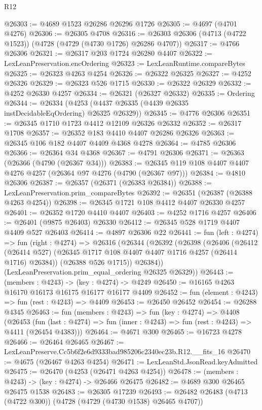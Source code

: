\begin{lexlean}{R12}
\begin{coremodule}
@26303 := @4689 @1523 @26286 @26296 @1726
@26305 := @4697 (@4701 @4276)
@26306 := @26305 @4708
@26316 := @26303 @26306 (@4713 (@4722 @1523)) (@4728 (@4729 (@4730 @1726) @26286 @4707))
@26317 := @4766 @26306
@26321 := @26317 @203 @1724 @26280 @4407
@26322 := LexLeanPreservation.encOrdering
@26323 := LexLeanRuntime.compareBytes
@26325 := @26323 @4263 @4254
@26326 := @26322 @26325
@26327 := @4252 @26326
@26329 := @26323 @526 @1715
@26330 := @26322 @26329
@26332 := @4252 @26330 @4257
@26334 := @26321 (@26327 @26332)
@26335 := Ordering
@26344 := @26334 (@4253 (@4437 @26335 (@4439 @26335 instDecidableEqOrdering) @26325 @26329))
@26345 := @4776 @26306
@26351 := @26345 @1710 @1723 @4412 @12109 @26326 @26332
@26352 := @26317 @1708
@26357 := @26352 @183 @4410 @4407 @26286 @26326
@26363 := @26345 @106 @182 @4407 @4409 @4368 @4278
@26364 := @4785 @26306
@26366 := @26364 @34 @4368
@26367 := @4791 @26306
@26371 := @26363 (@26366 (@4790 (@26367 @34)))
@26383 := @26345 @119 @108 @4407 @4407 @4276 @4257 (@26364 @97 @4276 (@4790 (@26367 @97)))
@26384 := @4810 @26306
@26387 := @26357 (@26371 (@26383 @26384))
@26388 := LexLeanPreservation.prim_compareBytes
@26392 := @26351 (@26387 (@26388 @4263 @4254))
@26398 := @26345 @1721 @108 @4412 @4407 @26330 @4257
@26401 := @26352 @1720 @4410 @4407
@26403 := @4252 @1716 @4257
@26406 := @26401 (@9875 @26403) @26330
@26412 := @26345 @528 @1719 @4407 @4409 @527 @26403
@26414 := @4897 @26306 @22
@26441 := fun (left : @4274) =>
  fun (right : @4274) =>
  @26316
    (@26344
      (@26392
        (@26398
          (@26406
            (@26412 (@26414 @527) (@26345 @1717 @108 @4407 @4407 @1716 @4257 (@26414 @1716) @26384))
            (@26388 @526 @1715))
          @26384))
      (LexLeanPreservation.prim_equal_ordering @26325 @26329))
@26443 := (members : @4243) -> (key : @4274) -> @4249
@26450 := @16165 @4263 @16170 @16173 @16175 @16177 @16177 @4409
@26452 := fun (element : @4243) => fun (rest : @4243) => @4409
@26453 := @26450 @26452
@26454 := @26288 @4345
@26463 := fun (members : @4243) =>
  fun (key : @4274) =>
  @4408
    (@26453
      (fun (last : @4274) => fun (inner : @4243) => fun (rest : @4243) => @4411 (@26454 @4383)))
@26464 := @4671 @300
@26465 := @16723 @4278
@26466 := @26464 @26465
@26467 := LexLeanPreserve.Cc5b6f2e6d9333bad985206c2340ec23b.R12.__fits_16
@26470 := @4675 (@26467 @4263 @4254)
@26471 := LexLeanStd.JsonRead.keyAdmitted
@26475 := @26470 (@4253 (@26471 @4263 @4254))
@26478 := (members : @4243) -> (key : @4274) -> @26466 @26475
@26482 := @4689 @300 @26465 @26475 @1538
@26483 := @26305 @17239
@26493 := @26482 @26483 (@4713 (@4722 @300)) (@4728 (@4729 (@4730 @1538) @26465 @4707))

\end{coremodule}
\end{lexlean}
